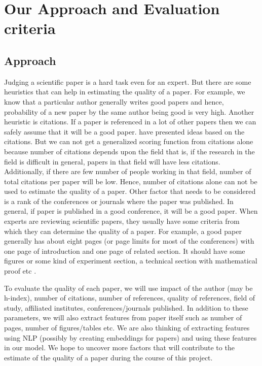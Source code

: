 \documentclass[a4paper, 11pt]{article}
\begin{document}
\section{Our Approach and Evaluation criteria}
\subsection{Approach}
Judging a scientific paper is a hard task even for an expert. But there are some heuristics that can help in estimating the quality of a paper. For example, we know that a particular author generally writes good papers and hence, probability of a new paper by the same author being good is very high. Another heuristic is citations. If a paper is referenced in a lot of other papers then we can safely assume that it will be a good paper. \cite{Hirsch} \cite{pinski} have presented ideas based on the citations. But we can not get a generalized scoring function from citations alone because number of citations depends upon the field that is, if the research in the field is difficult in general, papers in that field will have less citations. Additionally, if there are few number of people working in that field, number of total citations per paper will be low. Hence, number of citations alone can not be used to estimate the quality of a paper. Other factor that needs to be considered is a rank of the conferences or journals where the paper was published. In general, if paper is published in a good conference, it will be a good paper.  When experts are reviewing scientific papers, they usually have some criteria from which they can determine the quality of a paper. For example, a good paper generally has about eight pages (or page limits for most of the conferences) with one page of introduction and one page of related section. It should have some figures or some kind of experiment section, a technical section with mathematical proof etc \cite{karpathy}.  
\par
To evaluate the quality of each paper, we will use impact of the author (may be h-index), number of citations, number of references, quality of references, field of study, affiliated institutes, conferences/journals published. In addition to these parameters, we will also extract features from paper itself such as number of pages, number of figures/tables etc. We are also thinking of extracting features using NLP (possibly by creating embeddings for papers) and using these features in our model. We hope to uncover more factors that will contribute to the estimate of the quality of a paper during the course of this project.
\end{document}
